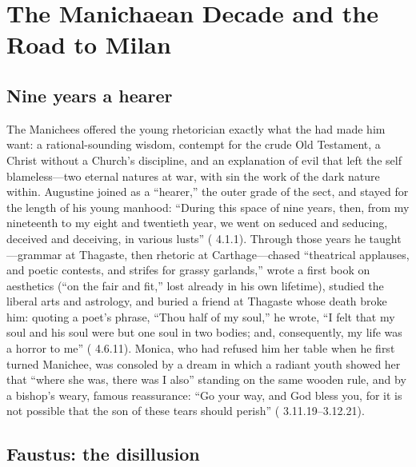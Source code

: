 \section{The Manichaean Decade and the Road to Milan}

\subsection{Nine years a hearer}

The Manichees offered the young rhetorician exactly what the 
had made him want: a rational-sounding wisdom, contempt for the crude Old
Testament, a Christ without a Church's discipline, and an explanation of evil
that left the self blameless---two eternal natures at war, with sin the work
of the dark nature within. Augustine joined as a ``hearer,'' the outer grade
of the sect, and stayed for the length of his young manhood: ``During this
space of nine years, then, from my nineteenth to my eight and twentieth year,
we went on seduced and seducing, deceived and deceiving, in various lusts''
( 4.1.1). Through those years he taught---grammar at
Thagaste, then rhetoric at Carthage---chased ``theatrical applauses, and
poetic contests, and strifes for grassy garlands,'' wrote a first book on
aesthetics (``on the fair and fit,'' lost already in his own lifetime),
studied the liberal arts and astrology, and buried a friend at Thagaste
whose death broke him: quoting a
poet's phrase, ``Thou half of my soul,'' he wrote, ``I felt that my soul and
his soul were but one soul in two bodies; and, consequently, my life was a
horror to me'' ( 4.6.11). Monica, who had refused him her
table when he first turned Manichee, was consoled by a dream in which a
radiant youth showed her that ``where she was, there was I also'' standing on
the same wooden rule, and by a bishop's weary, famous reassurance: ``Go your
way, and God bless you, for it is not possible that the son of these tears
should perish'' ( 3.11.19--3.12.21).

\subsection{Faustus: the disillusion}

